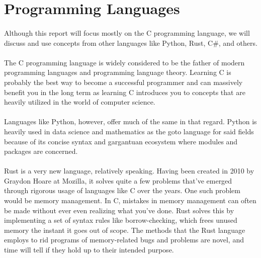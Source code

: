 \section{Programming Languages}
\paragraph{}
   Although this report will focus mostly on the C programming language, we will discuss and use concepts from other languages like Python, Rust, C\#,
   and others.

\paragraph{}
   The C programming language is widely considered to be the father of modern programming languages and programming language theory. Learning C is
   probably the best way to become a successful programmer and can massively benefit you in the long term as learning C introduces you to concepts
   that are heavily utilized in the world of computer science.

\paragraph{}
   Languages like Python, however, offer much of the same in that regard. Python is heavily used in data science and mathematics as the goto language
   for said fields because of its concise syntax and gargantuan ecosystem where modules and packages are concerned.

\paragraph{}
   Rust is a very new language, relatively speaking. Having been created in 2010 by Graydon Hoare at Mozilla, it solves quite a few problems that've
   emerged through rigorous usage of languages like C over the years. One such problem would be memory management. In C, mistakes in memory management
   can often be made without ever even realizing what you've done. Rust solves this by implementing a set of syntax rules like borrow-checking, which
   frees unused memory the instant it goes out of scope. The methods that the Rust language employs to rid programs of memory-related bugs and
   problems are novel, and time will tell if they hold up to their intended purpose.
